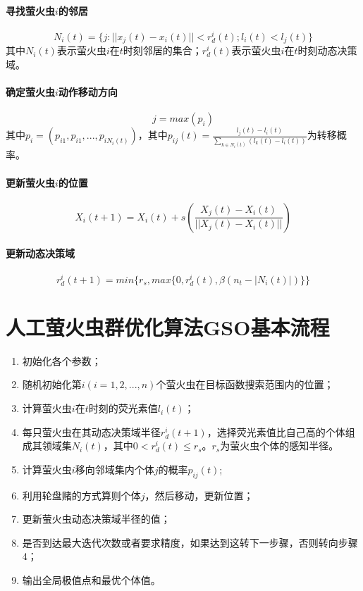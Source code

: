 \documentclass[UTF8]{ctexart}
\begin{document}
\paragraph{寻找萤火虫$i$的邻居}
$$N_i(t)=\{j:||x_j(t)-x_i(t)||<r_d^i(t);l_i(t)<l_j(t)\}$$
其中$N_i(t)$表示萤火虫$i$在$t$时刻邻居的集合；$r_d^i(t)$表示萤火虫$i$在$t$时刻动态决策域。
\paragraph{确定萤火虫$i$动作移动方向}
$$j=max(p_i)$$
其中$p_i=(p_{i1},p_{i1},...,p_{iN_i(t)})$，其中$p_{ij}(t)=\frac{l_j(t)-l_i(t)}{\sum_{k\in N_i(t)}{(l_k(t)-l_i(t))}}$为转移概率。
\paragraph{更新萤火虫$i$的位置}
$$X_i(t+1)=X_i(t)+s(\frac{X_j(t)-X_i(t)}{||X_j(t)-X_i(t)||})$$
\paragraph{更新动态决策域}
$$r_d^i(t+1)=min\{r_s,max\{0,r_d^i(t),\beta (n_t-|N_i(t)|)\}\}$$

	\section{人工萤火虫群优化算法GSO基本流程}
\begin{enumerate}
\item 初始化各个参数；
\item 随机初始化第$i(i=1,2,...,n)$个萤火虫在目标函数搜索范围内的位置；
\item 计算萤火虫$i$在$t$时刻的荧光素值$l_i(t)$；
\item 每只萤火虫在其动态决策域半径$r_d^i(t+1)$，选择荧光素值比自己高的个体组成其领域集$N_i(t)$，其中$0<r_d^i(t)\leq r_s$。$r_s$为萤火虫个体的感知半径。
\item 计算萤火虫$i$移向邻域集内个体$j$的概率$p_{ij}(t)$;
\item 利用轮盘赌的方式算则个体$j$，然后移动，更新位置；
\item 更新萤火虫动态决策域半径的值；
\item 是否到达最大迭代次数或者要求精度，如果达到这转下一步骤，否则转向步骤4；
\item 输出全局极值点和最优个体值。
\end{enumerate}
\end{document}
